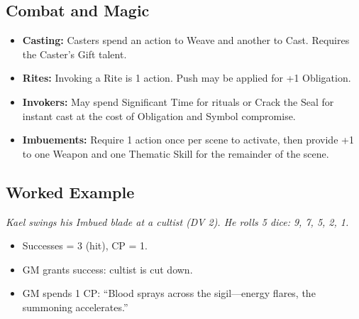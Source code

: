 \subsection{Combat and Magic}
\begin{itemize}
  \item \textbf{Casting:} Casters spend an action to Weave and another to Cast. Requires the Caster’s Gift talent.
  \item \textbf{Rites:} Invoking a Rite is 1 action. Push may be applied for +1 Obligation.
  \item \textbf{Invokers:} May spend Significant Time for rituals or Crack the Seal for instant cast at the cost of Obligation and Symbol compromise.
  \item \textbf{Imbuements:} Require 1 action once per scene to activate, then provide +1 to one Weapon and one Thematic Skill for the remainder of the scene.
\end{itemize}

\subsection{Worked Example}
\emph{Kael swings his Imbued blade at a cultist (DV 2). He rolls 5 dice: 9, 7, 5, 2, 1.}
\begin{itemize}
  \item Successes = 3 (hit), CP = 1.
  \item GM grants success: cultist is cut down.
  \item GM spends 1 CP: ``Blood sprays across the sigil—energy flares, the summoning accelerates.''
\end{itemize}
